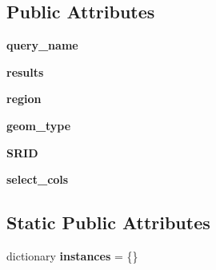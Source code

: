 \subsection*{Public Attributes}
\begin{DoxyCompactItemize}
\item 
\hypertarget{class_post_g_i_s_helpers_1_1_query_a706d7d70a7066397321be865498d00c6}{}{\bfseries query\+\_\+name}\label{class_post_g_i_s_helpers_1_1_query_a706d7d70a7066397321be865498d00c6}

\item 
\hypertarget{class_post_g_i_s_helpers_1_1_query_a34878bb3f66d0c82bcb69b230740bb60}{}{\bfseries results}\label{class_post_g_i_s_helpers_1_1_query_a34878bb3f66d0c82bcb69b230740bb60}

\item 
\hypertarget{class_post_g_i_s_helpers_1_1_query_ab927b3006bc5811d25032d2c437fb7f1}{}{\bfseries region}\label{class_post_g_i_s_helpers_1_1_query_ab927b3006bc5811d25032d2c437fb7f1}

\item 
\hypertarget{class_post_g_i_s_helpers_1_1_query_ad62d93aec6d82a9fc4c6163e565455f5}{}{\bfseries geom\+\_\+type}\label{class_post_g_i_s_helpers_1_1_query_ad62d93aec6d82a9fc4c6163e565455f5}

\item 
\hypertarget{class_post_g_i_s_helpers_1_1_query_a854bc699b4b841227568bf0828a95f67}{}{\bfseries S\+R\+I\+D}\label{class_post_g_i_s_helpers_1_1_query_a854bc699b4b841227568bf0828a95f67}

\item 
\hypertarget{class_post_g_i_s_helpers_1_1_query_a0f712cbb6791002bdd57b12e2a1c14a9}{}{\bfseries select\+\_\+cols}\label{class_post_g_i_s_helpers_1_1_query_a0f712cbb6791002bdd57b12e2a1c14a9}

\end{DoxyCompactItemize}
\subsection*{Static Public Attributes}
\begin{DoxyCompactItemize}
\item 
\hypertarget{class_post_g_i_s_helpers_1_1_query_afb80ded1f2426bcc599c70c497578e03}{}dictionary {\bfseries instances} = \{\}\label{class_post_g_i_s_helpers_1_1_query_afb80ded1f2426bcc599c70c497578e03}

\end{DoxyCompactItemize}


